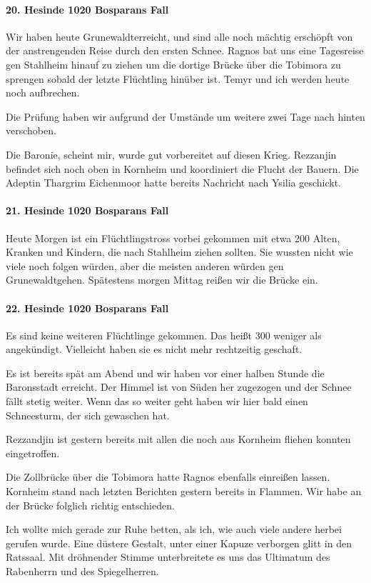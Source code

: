 \paragraph{20. Hesinde 1020 Bosparans Fall}
Wir haben heute Grunewaldterreicht, und sind alle noch mächtig erschöpft von der anstrengenden Reise durch den ersten Schnee. Ragnos bat uns eine Tagesreise gen Stahlheim hinauf zu ziehen um die dortige Brücke über die Tobimora zu sprengen sobald der letzte Flüchtling hinüber ist. Temyr und ich werden heute noch aufbrechen.

Die Prüfung haben wir aufgrund der Umstände um weitere zwei Tage nach hinten verschoben.

Die Baronie, scheint mir, wurde gut vorbereitet auf diesen Krieg. Rezzanjin befindet sich noch oben in Kornheim und koordiniert die Flucht der Bauern. Die Adeptin Thargrim Eichenmoor hatte bereits Nachricht nach Ysilia geschickt.

\paragraph{21. Hesinde 1020 Bosparans Fall}
Heute Morgen ist ein Flüchtlingstross vorbei gekommen mit etwa 200 Alten, Kranken und Kindern, die nach Stahlheim ziehen sollten. Sie wussten nicht wie viele noch folgen würden, aber die meisten anderen würden gen Grunewaldtgehen.
Spätestens morgen Mittag reißen wir die Brücke ein.

\paragraph{22. Hesinde 1020 Bosparans Fall}
Es sind keine weiteren Flüchtlinge gekommen. Das heißt 300 weniger als angekündigt. Vielleicht haben sie es nicht mehr rechtzeitig geschaft.

Es ist bereits spät am Abend und wir haben vor einer halben Stunde die Baronsstadt erreicht. Der Himmel ist von Süden her zugezogen und der Schnee fällt stetig weiter. Wenn das so weiter geht haben wir hier bald einen Schneesturm, der sich gewaschen hat.

Rezzandjin ist gestern bereits mit allen die noch aus Kornheim fliehen konnten eingetroffen.

Die Zollbrücke über die Tobimora hatte Ragnos ebenfalls einreißen lassen. Kornheim stand nach letzten Berichten gestern bereits in Flammen. Wir habe an der Brücke folglich richtig entschieden.

Ich wollte mich gerade zur Ruhe betten, als ich, wie auch viele andere herbei gerufen wurde. Eine düstere Gestalt, unter einer Kapuze verborgen glitt in den Ratssaal. Mit dröhnender Stimme unterbreitete es uns das Ultimatum des Rabenherrn und des Spiegelherren.

